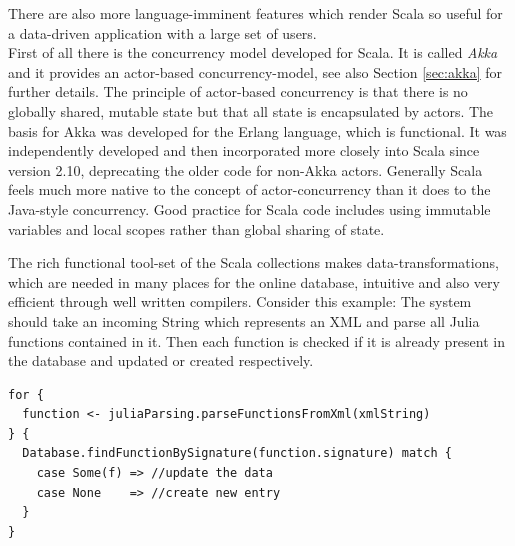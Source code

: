 \documentclass[twoside, 11pt]{scrartcl}
\begin{document}
There are also more language-imminent features which render Scala so useful for a data-driven application with a large set of users.\\
First of all there is the concurrency model developed for Scala. It is called \textit{Akka} and it provides an actor-based concurrency-model, see also Section \ref{sec:akka} for further details. The principle of actor-based concurrency is that there is no globally shared, mutable state but that all state is encapsulated by actors. The basis for Akka was developed for the Erlang language, which is functional. It was independently developed and then incorporated more closely into Scala since version 2.10, deprecating the older code for non-Akka actors. Generally Scala feels much more native to the concept of actor-concurrency than it does to the Java-style concurrency. Good practice for Scala code includes using immutable variables and local scopes rather than global sharing of state.

The rich functional tool-set of the Scala collections makes data-transformations, which are needed in many places for the online database, intuitive and also very efficient through well written compilers. Consider this example: The system should take an incoming String which represents an XML and parse all Julia functions contained in it. Then each function is checked if it is already present in the database and updated or created respectively.

\begin{verbatim}
for {
  function <- juliaParsing.parseFunctionsFromXml(xmlString)
} {
  Database.findFunctionBySignature(function.signature) match {
    case Some(f) => //update the data
    case None    => //create new entry
  }
}
\end{verbatim}
\end{document}
